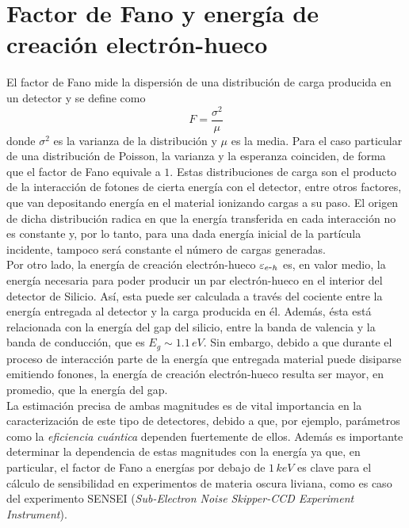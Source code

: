 \section{Factor de Fano y energía de creación electrón-hueco}
\noindent El factor de Fano mide la dispersión de una distribución de carga producida en un detector y se define como
\begin{equation*}
    F = \frac{\sigma^{2}}{\mu}
\end{equation*}
donde $\sigma^{2}$ es la varianza de la distribución y $\mu$ es la media. 
Para el caso particular de una distribución de Poisson, la varianza y la esperanza coinciden, de forma que el factor de Fano equivale a $1$. Estas distribuciones de carga son el producto de la interacción de fotones de cierta energía con el detector, entre otros factores, que van depositando energía en el material ionizando cargas a su paso. El origen de dicha distribución radica en que la energía transferida en cada interacción no es constante y, por lo tanto, para una dada energía inicial de la partícula incidente, tampoco será constante el número de cargas generadas.\\
\indent Por otro lado, la energía de creación electrón-hueco $\varepsilon_{e\mbox{-}h}$ es, en valor medio, la energía necesaria para poder producir un par electrón-hueco en el interior del detector de Silicio. Así, esta puede ser calculada a través del cociente entre la energía entregada al detector y la carga producida en él. Además, ésta está relacionada con la energía del gap del silicio, entre la banda de valencia y la banda de conducción, que es $E_{g}\sim 1.1\,\si{eV}$\cite{Janesick}. Sin embargo, debido a que durante el proceso de interacción parte de la energía que entregada material puede disiparse emitiendo fonones, la energía de creación electrón-hueco resulta ser mayor, en promedio, que la energía del gap.\\
\indent La estimación precisa de ambas magnitudes es de vital importancia en la caracterización de este tipo de detectores, debido a que, por ejemplo, parámetros como la \textit{eficiencia cuántica} dependen fuertemente de ellos. Además es importante determinar la dependencia de estas magnitudes con la energía ya que, en particular, el factor de Fano a energías por debajo de $1\,\si{keV}$ es clave para el cálculo de sensibilidad en experimentos de materia oscura liviana, como es caso del experimento SENSEI (\textit{Sub-Electron Noise Skipper-CCD Experiment Instrument})\cite{barak}.
